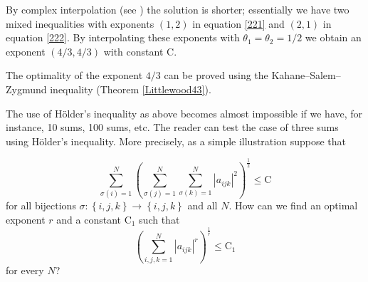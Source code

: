\documentclass[10pt]{amsart}
\numberwithin{equation}{section}
\begin{document}
By complex interpolation (see \cite{berg.lofst}) the solution is shorter;
essentially we have two mixed inequalities with exponents $\left( 1,2\right)
$ in equation \eqref{221} and $\left( 2,1\right) $ in equation \eqref{222}.
By interpolating these exponents with $\theta _{1}=\theta _{2}=1/2$ we
obtain an exponent $\left( 4/3,4/3\right) $ with constant $\mathrm{C}$.

The optimality of the exponent $4/3$ can be proved using the
Kahane--Salem--Zygmund inequality (Theorem \ref{Littlewood43}).

The use of H\"{o}lder's inequality as above becomes almost impossible if we
have, for instance, 10 sums, 100 sums, etc. The reader can test the case of
three sums using H\"{o}lder's inequality. More precisely, as a simple
illustration suppose that

\begin{equation*}
\sum\limits_{\sigma (i)=1}^{N}\left( \sum\limits_{\sigma
(j)=1}^{N}\sum\limits_{\sigma (k)=1}^{N}\left\vert a_{ijk}\right\vert
^{2}\right) ^{\frac{1}{2}}\leq \mathrm{C}
\end{equation*}for all bijections $\sigma :\left\{ i,j,k\right\} \rightarrow \left\{
i,j,k\right\} $ and all $N.$ How can we find an optimal exponent $r$ and a
constant $\mathrm{C}_{1}$ such that\begin{equation*}
\left( \sum\limits_{i,j,k=1}^{N}\left\vert a_{ijk}\right\vert ^{r}\right) ^{\frac{1}{r}}\leq \mathrm{C}_{1}
\end{equation*}
for every $N$?
\end{document}
